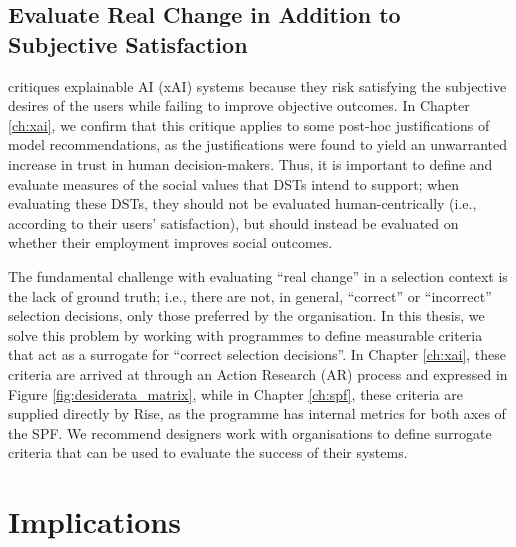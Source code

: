 \subsection{Evaluate Real Change in Addition to Subjective Satisfaction}\label{ssec:real_change}
\textcite{Lipton} critiques explainable AI (xAI) systems because they risk satisfying the subjective desires of the users while failing to improve objective outcomes. In Chapter \ref{ch:xai}, we confirm that this critique applies to some post-hoc justifications of model recommendations, as the justifications were found to yield an unwarranted increase in trust in human decision-makers. Thus, it is important to define and evaluate measures of the social values that DSTs intend to support; when evaluating these DSTs, they should not be evaluated human-centrically (i.e., according to their users' satisfaction), but should instead be evaluated on whether their employment improves social outcomes.

The fundamental challenge with evaluating ``real change'' in a selection context is the lack of ground truth; i.e., there are not, in general, ``correct'' or ``incorrect'' selection decisions, only those preferred by the organisation. In this thesis, we solve this problem by working with programmes to define measurable criteria that act as a surrogate for ``correct selection decisions''. In Chapter \ref{ch:xai}, these criteria are arrived at through an Action Research (AR) process and expressed in Figure \ref{fig:desiderata_matrix}, while in Chapter \ref{ch:spf}, these criteria are supplied directly by Rise, as the programme has internal metrics for both axes of the SPF. We recommend designers work with organisations to define surrogate criteria that can be used to evaluate the success of their systems.

\section{Implications}

